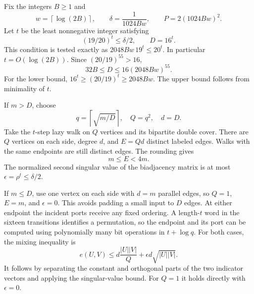\documentclass[11pt]{article}
\theoremstyle{remark}
\newcommand{\ceil}[1]{\left\lceil #1\right\rceil}
\begin{document}
Fix the integers \(B\ge1\) and
\begin{equation}\label{eq:code-parameters}
 w=\ceil{\log(2B)},\qquad
 \delta=\frac1{1024Bw},\qquad
 P=2(1024Bw)^2.
\end{equation}
Let \(t\) be the least nonnegative integer satisfying
\begin{equation}\label{eq:power-condition}
 (19/20)^t\le\delta/2,
 \qquad D=16^t.
\end{equation}
This condition is tested exactly as
\(2048Bw\,19^t\le20^t\). In particular \(t=O(\log(2B))\).
Since \((20/19)^{55}>16\),
\begin{equation}\label{eq:D-bound}
 32B\le D\le16(2048Bw)^{55}.
\end{equation}
For the lower bound, \(16^t\ge(20/19)^t\ge2048Bw\).
The upper bound follows from minimality of \(t\).

If \(m>D\), choose
\[
 q=\ceil{\sqrt{m/D}},\quad Q=q^2,\quad d=D.
\]
Take the \(t\)-step lazy walk on \(Q\) vertices and its bipartite
double cover. There are \(Q\) vertices on each side, degree \(d\),
and \(E=Qd\) distinct labeled edges. Walks with the same endpoints
are still distinct edges. The rounding gives
\begin{equation}\label{eq:rounding}
 m\le E<4m.
\end{equation}
The normalized second singular value of the biadjacency matrix is at
most \(\epsilon=\rho^t\le\delta/2\).

If \(m\le D\), use one vertex on each side with \(d=m\) parallel edges,
so \(Q=1\), \(E=m\), and \(\epsilon=0\).
This avoids padding a small input to \(D\) edges.
At either endpoint the incident ports receive any fixed ordering.
A length-\(t\) word in the sixteen transitions identifies a permutation,
so the endpoint and its port can be computed using polynomially many
bit operations in \(t+\log q\).
For both cases, the mixing inequality is
\begin{equation}\label{eq:mixing}
 e(U,V)\le d\frac{|U||V|}{Q}
              +\epsilon d\sqrt{|U||V|}.
\end{equation}
It follows by separating the constant and orthogonal parts of the two
indicator vectors and applying the singular-value bound.
For \(Q=1\) it holds directly with \(\epsilon=0\).
\end{document}
